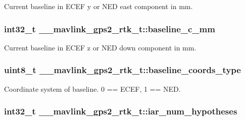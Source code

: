 Current baseline in E\+C\+E\+F y or N\+E\+D east component in mm. 

\hypertarget{struct____mavlink__gps2__rtk__t_a501dacf0b85ade7c8c7d94f0ef3ebf9a}{
\subsubsection[{baseline\+\_\+c\+\_\+mm}]{\setlength{\rightskip}{0pt plus 5cm}int32\+\_\+t \+\_\+\+\_\+mavlink\+\_\+gps2\+\_\+rtk\+\_\+t\+::baseline\+\_\+c\+\_\+mm}}\label{struct____mavlink__gps2__rtk__t_a501dacf0b85ade7c8c7d94f0ef3ebf9a}


Current baseline in E\+C\+E\+F z or N\+E\+D down component in mm. 

\hypertarget{struct____mavlink__gps2__rtk__t_ac23c4ab684fc2cfeaaa508ef703ea1ad}{
\subsubsection[{baseline\+\_\+coords\+\_\+type}]{\setlength{\rightskip}{0pt plus 5cm}uint8\+\_\+t \+\_\+\+\_\+mavlink\+\_\+gps2\+\_\+rtk\+\_\+t\+::baseline\+\_\+coords\+\_\+type}}\label{struct____mavlink__gps2__rtk__t_ac23c4ab684fc2cfeaaa508ef703ea1ad}


Coordinate system of baseline. 0 == E\+C\+E\+F, 1 == N\+E\+D. 

\hypertarget{struct____mavlink__gps2__rtk__t_a23b98c19d6cf75f0914491b11aa50c2f}{
\subsubsection[{iar\+\_\+num\+\_\+hypotheses}]{\setlength{\rightskip}{0pt plus 5cm}int32\+\_\+t \+\_\+\+\_\+mavlink\+\_\+gps2\+\_\+rtk\+\_\+t\+::iar\+\_\+num\+\_\+hypotheses}}\label{struct____mavlink__gps2__rtk__t_a23b98c19d6cf75f0914491b11aa50c2f}


